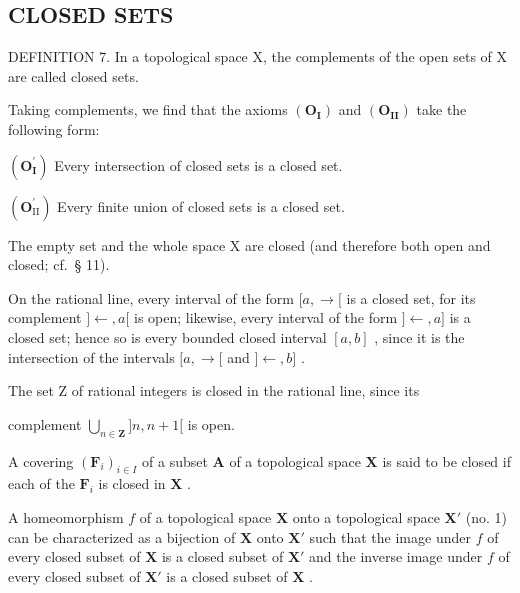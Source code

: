 \subsection{CLOSED SETS}

DEFINITION 7. In a topological space X, the complements of the open sets of X are called closed sets.

Taking complements, we find that the axioms \((\mathbf{O}_{\mathbf{I}})\) and \((\mathbf{O}_{\mathbf{II}})\) take the following form:

\((\mathbf{O}_{\mathbf{I}}^{\prime})\) Every intersection of closed sets is a closed set.

\((\mathbf{O}_{\mathrm{II}}^{\prime})\) Every finite union of closed sets is a closed set.

The empty set and the whole space X are closed (and therefore both open and closed; cf.~§ 11).

On the rational line, every interval of the form \([a, \rightarrow[\) is a closed set, for its complement \(]\leftarrow, a[\) is open; likewise, every interval of the form \(]\leftarrow, a]\) is a closed set; hence so is every bounded closed interval \([a, b]\) , since it is the intersection of the intervals \([a, \rightarrow[\) and \(]\leftarrow, b]\) .

The set Z of rational integers is closed in the rational line, since its

complement \(\bigcup_{n\in \mathbf{Z}}]n,n + 1[\) is open.

A covering \((\mathbf{F}_i)_{i\in I}\) of a subset \(\mathbf{A}\) of a topological space \(\mathbf{X}\) is said to be closed if each of the \(\mathbf{F}_i\) is closed in \(\mathbf{X}\) .

A homeomorphism \(f\) of a topological space \(\mathbf{X}\) onto a topological space \(\mathbf{X}'\) (no. 1) can be characterized as a bijection of \(\mathbf{X}\) onto \(\mathbf{X}'\) such that the image under \(f\) of every closed subset of \(\mathbf{X}\) is a closed subset of \(\mathbf{X}'\) and the inverse image under \(f\) of every closed subset of \(\mathbf{X}'\) is a closed subset of \(\mathbf{X}\) .

